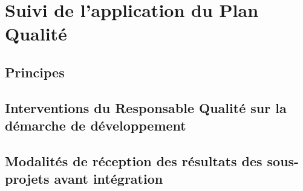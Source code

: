 \section{Suivi de l'application du Plan Qualité}

\subsection{Principes}

\subsection{Interventions du Responsable Qualité sur la démarche de développement}

\subsection{Modalités de réception des résultats des sous-projets avant intégration}

